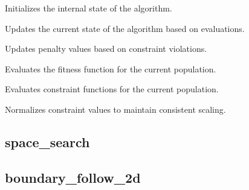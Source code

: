 \documentclass[12pt,a4paper]{article}
\begin{document}
\noindent Initializes the internal state of the algorithm.

\vspace{5mm}
\noindent {}


\noindent Updates the current state of the algorithm based on evaluations.

\vspace{5mm}
\noindent {}


\noindent Updates penalty values based on constraint violations.

\vspace{5mm}
\noindent {}


\noindent Evaluates the fitness function for the current population.

\vspace{5mm}
\noindent {}


\noindent Evaluates constraint functions for the current population.

\vspace{5mm}
\noindent {}


\noindent Normalizes constraint values to maintain consistent scaling.


\subsection{space\_search}

\subsection{boundary\_follow\_2d}
\vspace{5mm}
\noindent {}
\end{document}
